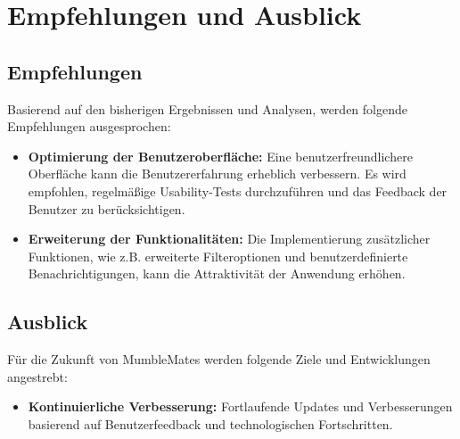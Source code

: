 \section{Empfehlungen und Ausblick}

\subsection{Empfehlungen}

Basierend auf den bisherigen Ergebnissen und Analysen, werden folgende Empfehlungen ausgesprochen:

\begin{itemize}
    \item \textbf{Optimierung der Benutzeroberfläche:} Eine benutzerfreundlichere Oberfläche kann die Benutzererfahrung erheblich verbessern. Es wird empfohlen, regelmäßige Usability-Tests durchzuführen und das Feedback der Benutzer zu berücksichtigen.
    \item \textbf{Erweiterung der Funktionalitäten:} Die Implementierung zusätzlicher Funktionen, wie z.B. erweiterte Filteroptionen und benutzerdefinierte Benachrichtigungen, kann die Attraktivität der Anwendung erhöhen.
\end{itemize}

\subsection{Ausblick}

Für die Zukunft von MumbleMates werden folgende Ziele und Entwicklungen angestrebt:

\begin{itemize}
    \item \textbf{Kontinuierliche Verbesserung:} Fortlaufende Updates und Verbesserungen basierend auf Benutzerfeedback und technologischen Fortschritten.
\end{itemize}

